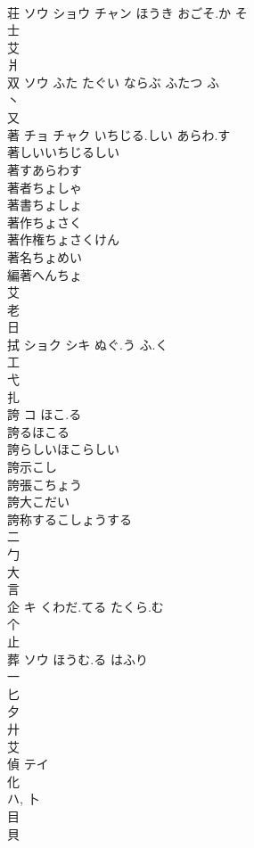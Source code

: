 \documentclass[8pt]{extreport}
\begin{document}
\begin{CJK}{UTF8}{min}
\\	荘	ソウ ショウ チャン	ほうき おごそ.か そ	
\\	士 
\\	艾 
\\	爿 
\\	双	ソウ	ふた たぐい ならぶ ふたつ ふ	
\\	丶 
\\	又 
\\	著	チョ チャク	いちじる.しい あらわ.す	
\\	著しいいちじるしい 
\\	著すあらわす 
\\	著者ちょしゃ 
\\	著書ちょしょ 
\\	著作ちょさく 
\\	著作権ちょさくけん 
\\	著名ちょめい 
\\	編著へんちょ 
\\	艾 
\\	老 
\\	日 
\\	拭	ショク シキ	ぬぐ.う ふ.く	
\\	工 
\\	弋 
\\	扎	
\\	誇	コ	ほこ.る	
\\	誇るほこる
\\	誇らしいほこらしい
\\	誇示こし
\\	誇張こちょう
\\	誇大こだい
\\	誇称するこしょうする
\\	二 
\\	勹 
\\	大 
\\	言 
\\	企	キ	くわだ.てる たくら.む	
\\	个 
\\	止 
\\	葬	ソウ	ほうむ.る はふり	
\\	一 
\\	匕 
\\	夕 
\\	廾 
\\	艾 
\\	偵	テイ		
\\	化 
\\	ハ, 卜 
\\	目 
\\	貝 

\end{CJK}
\end{document}
